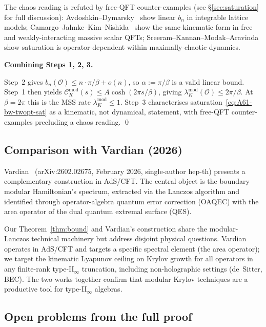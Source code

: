 \documentclass[12pt,a4paper]{article}
\begin{document}
The chaos reading is refuted by free-QFT counter-examples
(see \S\ref{sec:saturation} for full discussion):
Avdoshkin--Dymarsky~\cite{AvdoshkinDymarsky2019} show linear $b_n$
in integrable lattice models; Camargo--Jahnke--Kim--Nishida~\cite{Camargo2023}
show the same kinematic form in free and weakly-interacting massive
scalar QFTs; Sreeram--Kannan--Modak--Aravinda~\cite{Sreeram2025}
show saturation is operator-dependent within maximally-chaotic dynamics.

\medskip

\noindent\textbf{Combining Steps 1, 2, 3.}

Step~2 gives $b_n(\mathcal{O}) \le n\cdot\pi/\beta + o(n)$, so
$\alpha := \pi/\beta$ is a valid linear bound. Step~1 then yields
$\mathcal{C}_K^{\mathrm{mod}}(s) \le A\cosh(2\pi s/\beta)$, giving
$\lambda_K^{\mathrm{mod}}(\mathcal{O}) \le 2\pi/\beta$.
At $\beta = 2\pi$ this is the MSS rate $\lambda_K^{\mathrm{mod}} \le 1$.
Step~3 characterises saturation~\eqref{eq:A61-bw-twopt-sat} as a
kinematic, not dynamical, statement, with free-QFT counter-examples
precluding a chaos reading. \qed

\subsection{Comparison with Vardian (2026)}
\label{ssec:A61-vardian}

Vardian~\cite{Vardian2026} (arXiv:2602.02675, February 2026,
single-author hep-th) presents a complementary construction in AdS/CFT.
The central object is the boundary modular Hamiltonian's spectrum,
extracted via the Lanczos algorithm and identified through
operator-algebra quantum error correction (OAQEC) with the area
operator of the dual quantum extremal surface (QES).

Our Theorem~\ref{thm:bound} and Vardian's construction share the
modular-Lanczos technical machinery but address disjoint physical
questions. Vardian operates in AdS/CFT and targets a specific spectral
element (the area operator); we target the kinematic Lyapunov ceiling on
Krylov growth for all operators in any finite-rank type-II$_\infty$
truncation, including non-holographic settings (de~Sitter, BEC).
The two works together confirm that modular Krylov techniques are a
productive tool for type-II$_\infty$ algebras.

\subsection{Open problems from the full proof}
\label{ssec:A61-open}
\end{document}
